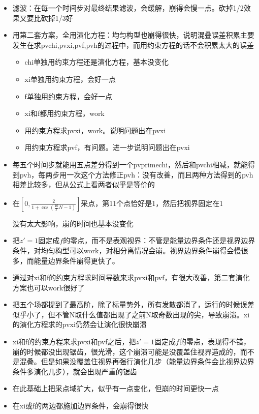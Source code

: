 \documentclass[12pt,a4paper]{ctexart}
\numberwithin{equation}{section}
\begin{document}
\begin{itemize}
    \item 滤波：在每一个时间步对最终结果滤波，会缓解，崩得会慢一点。砍掉1/2效果又要比砍掉1/3好
    \item 用第二套方案，全用演化方程：均匀构型也崩得很快，说明混叠误差积累主要发生在求pvchi,pvxi,pvf,pvh的过程中，而用约束方程的话不会积累太大的误差
    \begin{itemize}
        \item chi单独用约束方程还是演化方程，基本没变化
        \item xi单独用约束方程，会好一点
        \item f单独用约束方程，会好一点
        \item xi和f都用约束方程，work
        \item 用约束方程求pvxi，work。说明问题出在pvxi
        \item 用约束方程求pvf，有问题。进一步说明问题出在pvxi
    \end{itemize}
    \item 每五个时间步就能用五点差分得到一个pvprimechi，然后和pvchi相减，就能得到pvh，每两步用一次这个方法修正pvh：没有改善，而且两种方法得到的pvh相差比较多，但从公式上看两者似乎是等价的
    \item 在$[0,\frac{2}{1+\cos(\frac{10}\pi{N-1})}]$采点，第11个点恰好是1，然后把视界固定在1
    
    没有太大影响，崩的时间也基本没变化
    \item 把$z'=1$固定成$f$的零点，而不是表观视界：不管是能量边界条件还是视界边界条件，对均匀构型可以work，对相分离情况会崩。视界边界条件崩得会慢很多，而能量边界条件崩得更快了。
    \item 通过对xi和f的约束方程求时间导数来求pvxi和pvf，有很大改善，第二套演化方案也可以work很好了
    \item 把五个场都提到了最高阶，除了标量势外，所有发散都消了，运行的时候误差似乎小了，但不管N取什么值都出现了之前N取奇数出现的尖，导致崩溃。xi的演化方程求的pvxi仍然会让演化很快崩溃
    \item xi和f的约束方程来求pvxi和pvf之后，把$z'=1$固定成$f$的零点，表现得不错，崩的时候都没出现锯齿，很光滑，这个崩溃可能是没覆盖住视界造成的，而不是混叠。但是如果没覆盖住视界再强行演化几步（能量边界条件会比视界边界条件多演化几步），就会出现严重的锯齿
    \item 在此基础上把采点域扩大，似乎有一点变化，但崩的时间更快一点
    \item 在xi或f的两边都施加边界条件，会崩得很快
\end{itemize}
\end{document}

